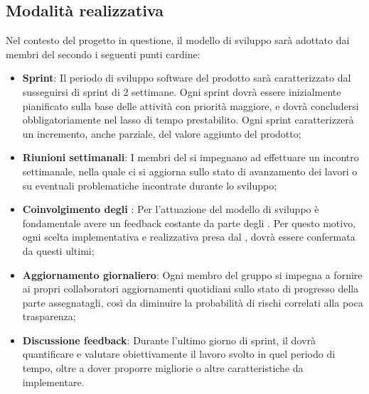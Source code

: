 \subsection{Modalità realizzativa}
Nel contesto del progetto in questione, il modello di sviluppo  sarà adottato dai membri
del  secondo i seguenti punti cardine:
\begin{itemize}
    \item \textbf{Sprint}: Il periodo di sviluppo software del prodotto sarà caratterizzato dal susseguirsi di sprint di 2 settimane. Ogni sprint dovrà essere inizialmente pianificato sulla base delle attività con priorità maggiore, e dovrà concludersi obbligatoriamente nel lasso di tempo prestabilito. Ogni sprint caratterizzerà un incremento, anche parziale, del valore aggiunto del prodotto;
    \item \textbf{Riunioni settimanali}: I membri del  si impegnano ad effettuare un incontro settimanale, nella quale ci si aggiorna sullo stato di avanzamento dei lavori o su eventuali problematiche incontrate durante lo sviluppo;
    \item \textbf{Coinvolgimento degli }: Per l’attuazione del modello di sviluppo  è fondamentale avere un feedback costante da parte degli . Per questo motivo, ogni scelta implementativa e realizzativa presa dal , dovrà essere confermata da questi ultimi;
    \item \textbf{Aggiornamento giornaliero}: Ogni membro del gruppo \gruppo{} si impegna a fornire ai propri collaboratori aggiornamenti quotidiani sullo stato di progresso della parte assegnatagli, così da diminuire la probabilità di rischi correlati alla poca trasparenza;
    \item \textbf{Discussione feedback}: Durante l’ultimo giorno di sprint, il  dovrà quantificare e valutare obiettivamente il lavoro svolto in quel periodo di tempo, oltre a dover proporre migliorie o altre caratteristiche da implementare.
\end{itemize}